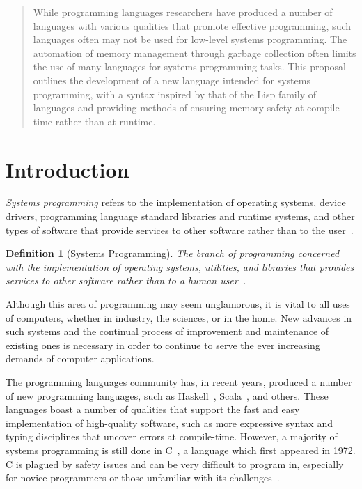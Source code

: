 \documentclass[11pt,draft]{article}
\theoremstyle{break}
\newtheorem{defn}{Definition}
\begin{document}
\begin{quote}
While programming languages researchers have produced a number of languages with various qualities that promote effective programming, such languages often may not be used for low-level systems programming. The automation of memory management through garbage collection often limits the use of many languages for systems programming tasks. This proposal outlines the development of a new language intended for systems programming, with a syntax inspired by that of the Lisp family of languages and providing methods of ensuring memory safety at compile-time rather than at runtime.
\end{quote}

\section{Introduction}
\label{sec:introduction}
\vspace*{-.1in}

\textit{Systems programming} refers to the implementation of operating systems, device drivers, programming language standard libraries and runtime systems, and other types of software that provide services to other software rather than to the user~\cite{Narten:2003:SP:1074100.1074850,Shapiro:2006:PLC:1215995.1216004}.

\begin{defn}[Systems Programming]
The branch of programming concerned with the implementation of operating systems, utilities, and libraries that provides services to other software rather than to a human user~\cite{Narten:2003:SP:1074100.1074850}.
\end{defn}

Although this area of programming may seem unglamorous, it is vital to all uses of computers, whether in industry, the sciences, or in the home. New advances in such systems and the continual process of improvement and maintenance of existing ones is necessary in order to continue to serve the ever increasing demands of computer applications.

The programming languages community has, in recent years, produced a number of new programming languages, such as Haskell~\cite{jones2003haskell,hudak1992report}, Scala~\cite{odersky2004scala,odersky2004overview}, and others. These languages boast a number of qualities that support the fast and easy implementation of high-quality software, such as more expressive syntax and typing disciplines that uncover errors at compile-time. However, a majority of systems programming is still done in C~\cite{kernighan1988c}, a language which first appeared in 1972. C is plagued by safety issues and can be very difficult to program in, especially for novice programmers or those unfamiliar with its challenges~\cite{Shapiro:2006:PLC:1215995.1216004,Ray:2014:LSS:2635868.2635922,Bhattacharya:2011:APL:1985793.1985817}.
\end{document}

